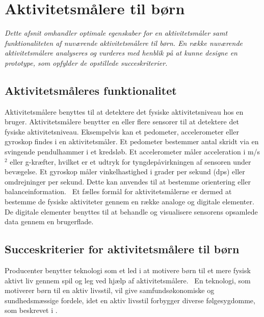 \section{Aktivitetsmålere til børn} \label{tracker_intro}
\textit{Dette afsnit omhandler optimale egenskaber for en aktivitetsmåler samt funktionaliteten af nuværende aktivitetsmålere til børn. En række nuværende aktivitetsmålere analyseres og vurderes med henblik på at kunne designe en prototype, som opfylder de opstillede succeskriterier.}

\subsection{Aktivitetsmåleres funktionalitet}
Aktivitetsmålere benyttes til at detektere det fysiske aktivitetsniveau hos en bruger. Aktivitetsmålere benytter en eller flere sensorer til at detektere det fysiske aktivitetsniveau. Eksempelvis kan et pedometer, accelerometer eller gyroskop findes i en aktivitetsmåler. Et pedometer bestemmer antal skridt via en svingende pendulhammer i et kredsløb. Et accelerometer måler acceleration i m/s$^2$ eller g-kræfter, hvilket er et udtryk for tyngdepåvirkningen af sensoren under bevægelse. Et gyroskop måler vinkelhastighed i grader per sekund (dps) eller omdrejninger per sekund. Dette kan anvendes til at bestemme orientering eller balanceinformation.~\citep{Sparkfun,Woodford2016,Sparkfun_gyro} \newline
Et fælles formål for aktivitetsmålerne er dermed at bestemme de fysiske aktiviteter gennem en række analoge og digitale elementer. De digitale elementer benyttes til at behandle og visualisere sensorens opsamlede data gennem en brugerflade.

\subsection{Succeskriterier for aktivitetsmålere til børn} \label{succeskrav}
Producenter benytter teknologi som et led i at motivere børn til et mere fysisk aktivt liv gennem spil og leg ved hjælp af aktivitetsmålere.~\citep{Fuhu2015,PowerAbout2015} En teknologi, som motiverer børn til en aktiv livsstil, vil give samfundsøkonomiske og sundhedsmæssige fordele, idet en aktiv livsstil forbygger diverse følgesygdomme, som beskrevet i .

